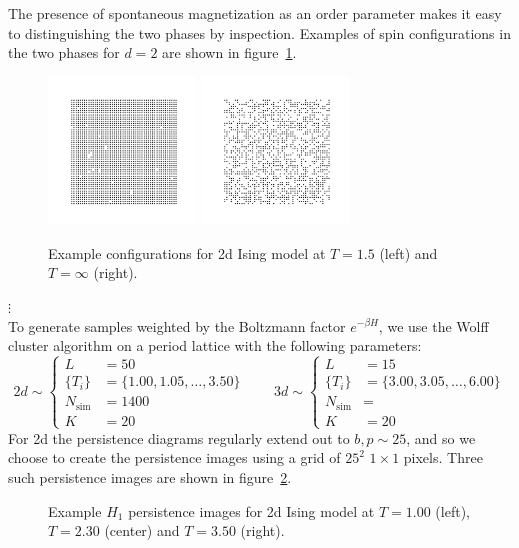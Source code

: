 \documentclass[11pt]{article}
\begin{document}
The presence of spontaneous magnetization as an order parameter makes it easy to distinguishing the two phases by inspection. Examples of spin configurations in the two phases for $d=2$ are shown in figure~\ref{fig:2dIsingExConfigs}.
\begin{figure}[b]
	\centering
	\includegraphics[width=0.35\textwidth]{ising_images/ising_T=150.png}
	\includegraphics[width=0.35\textwidth]{ising_images/ising_T=inf.png}
	\caption{Example configurations for 2d Ising model at $T=1.5$ (left) and $T=\infty$ (right).}
	\label{fig:2dIsingExConfigs}
\end{figure}

$\vdots$\\

To generate samples weighted by the Boltzmann factor $e^{-\beta H}$, we use the Wolff cluster algorithm on a period lattice with the following parameters:
\begin{equation}
	2d\sim\left\{\begin{aligned}
		L &= 50\\
		\{T_i\} &= \{1.00,1.05,\ldots,3.50\}\\
		N_\text{sim} &= 1400\\
		K &= 20
	\end{aligned}\right. \qquad 3d\sim\left\{\begin{aligned}
		L &= 15\\
		\{T_i\} &= \{3.00,3.05,\ldots,6.00\}\\
		N_\text{sim} &= \\
		K &= 20
	\end{aligned}\right.
\end{equation}
For 2d the persistence diagrams regularly extend out to $b,p\sim25$, and so we choose to create the persistence images using a grid of $25^2$ $1\times1$ pixels. Three such persistence images are shown in figure~\ref{fig:2dExPerIm}.
\begin{figure}[t]
	\centering
	\caption{Example $H_1$ persistence images for 2d Ising model at $T=1.00$ (left), $T=2.30$ (center) and $T=3.50$ (right).}
	\label{fig:2dExPerIm}
\end{figure}
\end{document}
